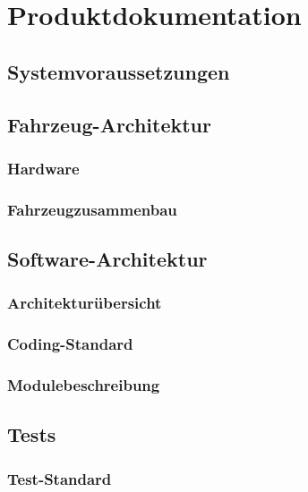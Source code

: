 \documentclass[a4paper, 12pt, titlepage]{scrartcl}
\begin{document}
\section{Produktdokumentation}
	\subsection{Systemvoraussetzungen} %
	\subsection{Fahrzeug-Architektur}
		\subsubsection{Hardware} %
		\subsubsection{Fahrzeugzusammenbau} %
	\subsection{Software-Architektur}
		\subsubsection{Architekturübersicht} %
		\subsubsection{Coding-Standard} %
		\subsubsection{Modulebeschreibung} %
	\subsection{Tests}
		\subsubsection{Test-Standard} %
\end{document}
